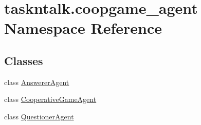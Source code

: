 \hypertarget{namespacetaskntalk_1_1coopgame__agent}{}\section{taskntalk.\+coopgame\+\_\+agent Namespace Reference}
\label{namespacetaskntalk_1_1coopgame__agent}
\subsection*{Classes}
\begin{DoxyCompactItemize}
\item 
class \hyperlink{classtaskntalk_1_1coopgame__agent_1_1AnswererAgent}{Answerer\+Agent}
\item 
class \hyperlink{classtaskntalk_1_1coopgame__agent_1_1CooperativeGameAgent}{Cooperative\+Game\+Agent}
\item 
class \hyperlink{classtaskntalk_1_1coopgame__agent_1_1QuestionerAgent}{Questioner\+Agent}
\end{DoxyCompactItemize}
